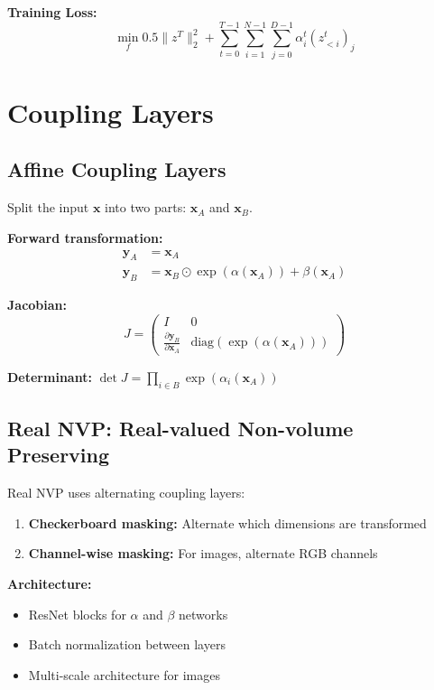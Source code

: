 \textbf{Training Loss:}
\begin{equation}
    \min_f 0.5\|z^T\|_2^2 + \sum_{t=0}^{T-1} \sum_{i=1}^{N-1} \sum_{j=0}^{D-1} \alpha_i^t(z^t_{<i})_j
\end{equation}

\section{Coupling Layers}

\subsection{Affine Coupling Layers}

Split the input $\mathbf{x}$ into two parts: $\mathbf{x}_A$ and $\mathbf{x}_B$.

\textbf{Forward transformation:}
\begin{align}
    \mathbf{y}_A &= \mathbf{x}_A \\
    \mathbf{y}_B &= \mathbf{x}_B \odot \exp(\alpha(\mathbf{x}_A)) + \beta(\mathbf{x}_A)
\end{align}

\textbf{Jacobian:}
\begin{equation}
    J = \begin{pmatrix}
        I & 0 \\
        \frac{\partial \mathbf{y}_B}{\partial \mathbf{x}_A} & \text{diag}(\exp(\alpha(\mathbf{x}_A)))
    \end{pmatrix}
\end{equation}

\textbf{Determinant:} $\det J = \prod_{i \in B} \exp(\alpha_i(\mathbf{x}_A))$

\subsection{Real NVP: Real-valued Non-volume Preserving}

Real NVP uses alternating coupling layers:
\begin{enumerate}
    \item \textbf{Checkerboard masking:} Alternate which dimensions are transformed
    \item \textbf{Channel-wise masking:} For images, alternate RGB channels
\end{enumerate}

\textbf{Architecture:}
\begin{itemize}
    \item ResNet blocks for $\alpha$ and $\beta$ networks
    \item Batch normalization between layers
    \item Multi-scale architecture for images
\end{itemize}

